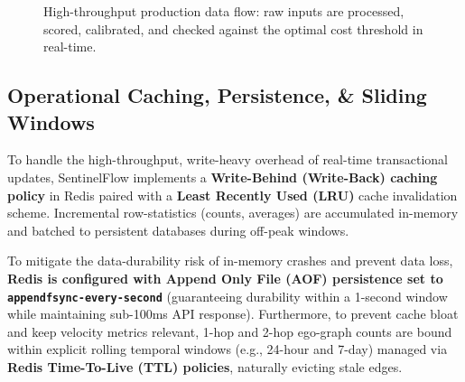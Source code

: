 \documentclass[11pt,a4paper]{article}
\begin{document}
\begin{figure}[H]
\centering
{}
\caption{High-throughput production data flow: raw inputs are processed, scored, calibrated, and checked against the optimal cost threshold in real-time.}
\end{figure}

\subsection*{Operational Caching, Persistence, \& Sliding Windows}
To handle the high-throughput, write-heavy overhead of real-time transactional updates, SentinelFlow implements a \textbf{Write-Behind (Write-Back) caching policy} in Redis paired with a \textbf{Least Recently Used (LRU)} cache invalidation scheme. Incremental row-statistics (counts, averages) are accumulated in-memory and batched to persistent databases during off-peak windows. 

To mitigate the data-durability risk of in-memory crashes and prevent data loss, \textbf{Redis is configured with Append Only File (AOF) persistence set to \texttt{appendfsync-every-second}} (guaranteeing durability within a 1-second window while maintaining sub-100ms API response). Furthermore, to prevent cache bloat and keep velocity metrics relevant, 1-hop and 2-hop ego-graph counts are bound within explicit rolling temporal windows (e.g., 24-hour and 7-day) managed via \textbf{Redis Time-To-Live (TTL) policies}, naturally evicting stale edges.
\end{document}
